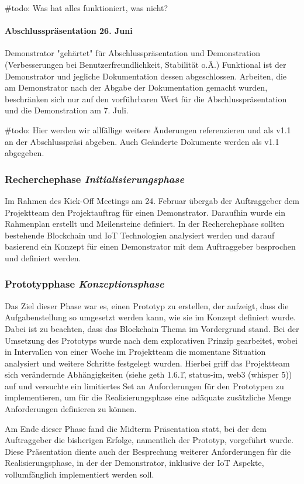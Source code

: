 \#todo: Was hat alles funktioniert, was nicht?

\paragraph{Abschlusspräsentation 26. Juni}
Demonstrator "gehärtet" für Abschlusspräsentation und Demonstration (Verbesserungen bei Benutzerfreundlichkeit, Stabilität o.Ä.)
Funktional ist der Demonstrator und jegliche Dokumentation dessen abgeschlossen. Arbeiten, die am Demonstrator nach der Abgabe der Dokumentation gemacht wurden, beschränken sich nur auf den vorführbaren Wert für die Abschlusspräsentation und die Demonstration am 7. Juli.

\#todo: Hier werden wir allfällige weitere Änderungen referenzieren und als v1.1 an der Abschlusspräsi abgeben. Auch Geänderte Dokumente werden als v1.1 abgegeben.

\subsubsection{Recherchephase \emph{Initialisierungsphase}}
Im Rahmen des Kick-Off Meetings am 24. Februar übergab der Auftraggeber dem Projektteam den Projektauftrag für einen Demonstrator. Daraufhin wurde ein Rahmenplan erstellt und Meilensteine definiert. In der Recherchephase sollten bestehende Blockchain und IoT Technologien analysiert werden und darauf basierend ein Konzept für einen Demonstrator mit dem Auftraggeber besprochen und definiert werden.

\subsubsection{Prototypphase \emph{Konzeptionsphase}}
Das Ziel dieser Phase war es, einen Prototyp zu erstellen, der aufzeigt, dass die Aufgabenstellung so umgesetzt werden kann, wie sie im Konzept definiert wurde. Dabei ist zu beachten, dass das Blockchain Thema im Vordergrund stand. Bei der Umsetzung des Prototyps wurde nach dem explorativen Prinzip gearbeitet, wobei in Intervallen von einer Woche im Projektteam die momentane Situation analysiert und weitere Schritte festgelegt wurden. Hierbei griff das Projektteam sich verändernde Abhängigkeiten (siehe geth 1.6.1\^, status-im, web3 (whisper 5)) auf und versuchte ein limitiertes Set an Anforderungen für den Prototypen zu implementieren, um für die Realisierungsphase eine adäquate zusätzliche Menge Anforderungen definieren zu können.

Am Ende dieser Phase fand die Midterm Präsentation statt, bei der dem Auftraggeber die bisherigen Erfolge, namentlich der Prototyp, vorgeführt wurde. Diese Präsentation diente auch der Besprechung weiterer Anforderungen für die Realisierungsphase, in der der Demonstrator, inklusive der IoT Aspekte, vollumfänglich implementiert werden soll.

